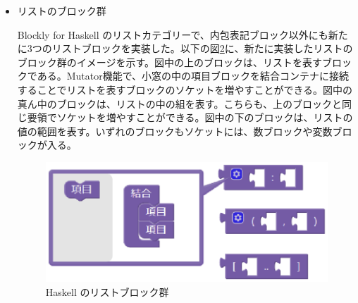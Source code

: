 \documentclass{eniepaper}
\begin{document}
\begin{itemize}
以下の図\ref{fig:haskell_function2}に、関数定義ブロックと関数呼び出しブロックの接続例を示す。図の関数定義ブロックでは、小窓のなかの引数コンテナに型ブロックが3個接続されている。そして、本体の関数定義ブロックには、仮引数の接続部が2か所ある。これは、小窓のなかの引数コンテナに接続されている一番下の型ブロックが、関数の返却値を示しているためである。

今回の例のパターンマッチングでは、第1仮引数は任意の変数で、第2仮引数は任意のリストである。その際のリストの先頭要素をｘ、それ以降のリストをxsを表す。式と書かれた接続部では、もしも実行ブロックを接続し、もしも任意の変数nとリストの先頭要素xが等しければリストxsを返し、それ以外なら先頭要素がxでそれ以降の要素は関数deleteOneを呼び出したリストを返す。リストの中で呼び出した関数deleteOneの第1実引数はn、第2実引数はxsである。

このブロック状態でのソースコードは以下のようになっている。


\begin{figure}[h]
\begin{center}
\texttt{[image: img/haskell\_function2.eps]}
\caption{関数ブロックと関数呼び出しブロックの接続例}%
\label{fig:haskell_function2}
\end{center}%
\end{figure}%

\item リストのブロック群

Blockly for Haskell のリストカテゴリーで、内包表記ブロック以外にも新たに3つのリストブロックを実装した。以下の図\ref{fig:haskell_list}に、新たに実装したリストのブロック群のイメージを示す。図中の上のブロックは、リストを表すブロックである。Mutator機能で、小窓の中の項目ブロックを結合コンテナに接続することでリストを表すブロックのソケットを増やすことができる。図中の真ん中のブロックは、リストの中の組を表す。こちらも、上のブロックと同じ要領でソケットを増やすことができる。図中の下のブロックは、リストの値の範囲を表す。いずれのブロックもソケットには、数ブロックや変数ブロックが入る。

\begin{figure}[h]
\begin{center}
\includegraphics[scale=0.5]{img/haskell_list.eps}
\caption{Haskell のリストブロック群}%
\label{fig:haskell_list}
\end{center}%
\end{figure}%


\end{itemize}
\end{document}
